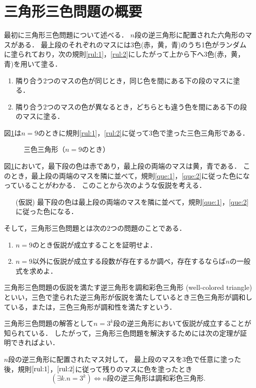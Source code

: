 \section{三角形三色問題の概要}
最初に三角形三色問題について述べる．
$n$段の逆三角形に配置された六角形のマスがある．
最上段のそれぞれのマスには$3$色(赤，黄，青)のうち1色がランダムに塗られており，次の規則\ref{rul:1}，\ref{rul:2}にしたがって上から下へ$3$色(赤，黄，青)を用いて塗る．
\begin{enumerate}[(規則1)]
\item \label{rul:1}
  隣り合う$2$つのマスの色が同じとき，同じ色を間にある下の段のマスに塗る．
\item \label{rul:2}
  隣り合う$2$つのマスの色が異なるとき，どちらとも違う色を間にある下の段のマスに塗る．
\end{enumerate}
図\ref{fig:nine_steps}は$n=9$のときに規則\ref{rul:1}，\ref{rul:2}に従って3色で塗った三色三角形である．
\begin{figure}[h]
    \centering
    
    \caption{三色三角形（$n=9$のとき）}
    \label{fig:nine_steps}
\end{figure}
図\ref{fig:nine_steps}において，最下段の色は赤であり，最上段の両端のマスは黄，青である．
このとき，最上段の両端のマスを隣に並べて，規則\ref{que:1}，\ref{que:2}に従った色になっていることがわかる．
このことから次のような仮説を考える．
\begin{itemize}
  \item[(仮説)]
  最下段の色は最上段の両端のマスを隣に並べて，規則\ref{que:1}，\ref{que:2}に従った色になる．
\end{itemize}
そして，三角形三色問題とは次の$2$つの問題のことである．
\begin{enumerate}
\item \label{que:1}
  $n=9$のとき仮説が成立することを証明せよ．
\item \label{que:2}
  $n=9$以外に仮説が成立する段数が存在するか調べ，存在するならば$n$の一般式を求めよ．
\end{enumerate}
\begin{dfn}[調和彩色三角形] \label{dfn:wc_tri}
  三角形三色問題の仮説を満たす逆三角形を調和彩色三角形 (well-colored triangle) といい，三色で塗られた逆三角形が仮説を満たしているとき三色三角形が調和している，または，三色三角形が調和性を満たすという．
\end{dfn}
三角形三色問題の解答として$n=3^k$段の逆三角形において仮説が成立することが知られている．
したがって，三角形三色問題を解決するためには次の定理が証明できればよい．
\begin{thm} \label{thm:tri_iff}
  $n$段の逆三角形に配置されたマス対して，
  最上段のマスを$3$色で任意に塗った後，規則$\ref{rul:1}$，$\ref{rul:2}$に従って残りのマスに色を塗ったとき
  \[
  (\exists k.n=3^k) \Leftrightarrow \text{$n$段の逆三角形は調和彩色三角形}.
  \]
\end{thm}

